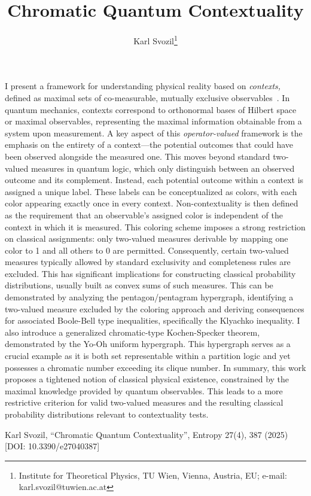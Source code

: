 \documentclass[10pt,a4paper]{article}
\begin{document}
\title{Chromatic Quantum Contextuality}
\author{Karl Svozil\thanks{Institute for Theoretical Physics, TU Wien, Vienna, Austria, EU; e-mail: karl.svozil@tuwien.ac.at}}
\date{}
\maketitle
{}

I present a framework for understanding physical reality based on \textit{contexts,} defined as maximal sets of co-measurable, mutually exclusive observables~\cite{svozil-2025-color}.
In quantum mechanics, contexts correspond to orthonormal bases of Hilbert space or maximal observables, representing the maximal information obtainable from a system upon measurement.
A key aspect of this \textit{operator-valued} framework is the emphasis on the entirety of a context---the potential outcomes that could have been observed alongside the measured one.
This moves beyond standard two-valued measures in quantum logic, which only distinguish between an observed outcome and its complement. Instead, each potential outcome within a context is assigned a unique label.
These labels can be conceptualized as colors, with each color appearing exactly once in every context. Non-contextuality is then defined as the requirement that an observable's assigned color is independent of the context in which it is measured.
This coloring scheme imposes a strong restriction on classical assignments: only two-valued measures derivable by mapping one color to 1 and all others to 0 are permitted.
Consequently, certain two-valued measures typically allowed by standard exclusivity and completeness rules are excluded.
This has significant implications for constructing classical probability distributions, usually built as convex sums of such measures.
This can be demonstrated by analyzing the pentagon/pentagram hypergraph, identifying a two-valued measure excluded by the coloring approach and deriving consequences for associated Boole-Bell type inequalities, specifically the Klyachko inequality.
I also introduce a generalized chromatic-type Kochen-Specker theorem, demonstrated by the Yo-Oh uniform hypergraph. This hypergraph serves as a crucial example as it is both set representable within a partition logic and yet possesses a chromatic number exceeding its clique number.
In summary, this work proposes a tightened notion of classical physical existence, constrained by the maximal knowledge provided by quantum observables.
This leads to a more restrictive criterion for valid two-valued measures and the resulting classical probability distributions relevant to contextuality tests.



\begin{thebibliography}{9}

 Karl Svozil, ``Chromatic Quantum Contextuality'', Entropy 27(4), 387 (2025) [DOI: 10.3390/e27040387]

\end{thebibliography}
\end{document}
